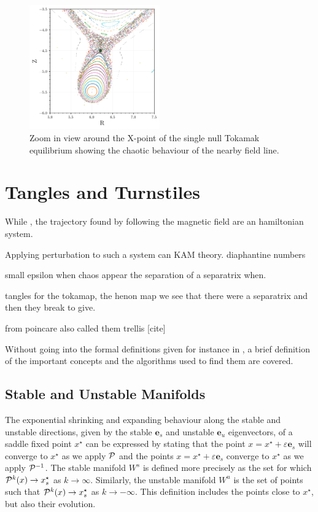 \begin{figure}
    \centering
    \includegraphics[width=0.5\textwidth]{images/toytok/perturbed-6-1/perturbed_6_1_closer.png}
    \caption{Zoom in view around the X-point of the single null Tokamak equilibrium showing the chaotic behaviour of the nearby field line.}
    \label{fig:xpoint-chaos}
\end{figure}

\chapter{Tangles and Turnstiles}\label{ch:tangleandturns}

While , the trajectory found by following the magnetic field are an hamiltonian system.

Applying perturbation to such a system can 
KAM theory. diaphantine numbers

small epsilon when chaos appear the separation of a separatrix when.

tangles for the tokamap, the henon map
we see that there were a separatrix and then they break to give.

from poincare also called them trellis [cite]

Without going into the formal definitions given for instance in \cite{hohloch_transport_2012}, a brief definition of the important concepts and the algorithms used to find them are covered.

\section{Stable and Unstable Manifolds}

The exponential shrinking and expanding behaviour along the stable and unstable directions, given by the stable $\textbf{e}_s$ and unstable $\textbf{e}_u$ eigenvectors,
of a saddle fixed point $x^\star$ can be expressed by stating that the point $x = x^\star + \varepsilon \textbf{e}_s$ will converge to $x^\star$ as we apply $\mathcal{P}$ and the points $x = x^\star + \varepsilon \textbf{e}_s$ converge to $x^\star$ as we apply $\mathcal{P}^{-1}$. The stable manifold $W^s$ is defined more precisely as the set for which $\mathcal{P}^k(x)\to x_s^\star$ as $k\to\infty$. Similarly, the unstable manifold $W^u$ is the set of points such that $\mathcal{P}^k(x)\to x_s^\star$ as $k\to -\infty$. This definition includes the points close to $x^\star$, but also their evolution. 

